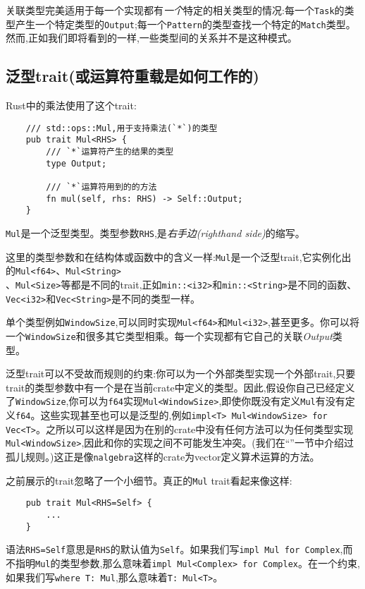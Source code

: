 关联类型完美适用于每一个实现都有\emph{一个}特定的相关类型的情况:每一个\texttt{Task}的类型产生一个特定类型的\texttt{Output};每一个\texttt{Pattern}的类型查找一个特定的\texttt{Match}类型。然而,正如我们即将看到的一样,一些类型间的关系并不是这种模式。

\subsection{泛型trait(或运算符重载是如何工作的)}
Rust中的乘法使用了这个trait:
\begin{verbatim}
    /// std::ops::Mul,用于支持乘法(`*`)的类型
    pub trait Mul<RHS> {
        /// `*`运算符产生的结果的类型
        type Output;

        /// `*`运算符用到的的方法
        fn mul(self, rhs: RHS) -> Self::Output;
    }
\end{verbatim}

\texttt{Mul}是一个泛型类型。类型参数\texttt{RHS},是\emph{右手边(righthand side)}的缩写。

这里的类型参数和在结构体或函数中的含义一样:\texttt{Mul}是一个泛型trait,它实例化出的\texttt{Mul<f64>}、\texttt{Mul<String>}\\
、\texttt{Mul<Size>}等都是不同的trait,正如\texttt{min::<i32>}和\texttt{min::<String>}是不同的函数、\texttt{Vec<i32>}和\texttt{Vec<String>}是不同的类型一样。

单个类型例如\texttt{WindowSize},可以同时实现\texttt{Mul<f64>}和\texttt{Mul<i32>},甚至更多。你可以将一个\texttt{WindowSize}和很多其它类型相乘。每一个实现都有它自己的关联\emph{Output}类型。

泛型trait可以不受故而规则的约束:你可以为一个外部类型实现一个外部trait,只要trait的类型参数中有一个是在当前crate中定义的类型。因此,假设你自己已经定义了\texttt{WindowSize},你可以为\texttt{f64}实现\texttt{Mul<WindowSize>},即使你既没有定义\texttt{Mul}有没有定义\texttt{f64}。这些实现甚至也可以是泛型的,例如\texttt{impl<T> Mul<WindowSize> for Vec<T>}。之所以可以这样是因为在别的crate中没有任何方法可以为任何类型实现\texttt{Mul<WindowSize>},因此和你的实现之间不可能发生冲突。(我们在“”一节中介绍过孤儿规则。)这正是像\texttt{nalgebra}这样的crate为vector定义算术运算的方法。

之前展示的trait忽略了一个小细节。真正的\texttt{Mul} trait看起来像这样:
\begin{verbatim}
    pub trait Mul<RHS=Self> {
        ...
    }
\end{verbatim}

语法\texttt{RHS=Self}意思是\texttt{RHS}的默认值为\texttt{Self}。如果我们写\texttt{impl Mul for Complex},而不指明\texttt{Mul}的类型参数,那么意味着\texttt{impl Mul<Complex> for Complex}。在一个约束,如果我们写\texttt{where T: Mul},那么意味着\texttt{T: Mul<T>}。

